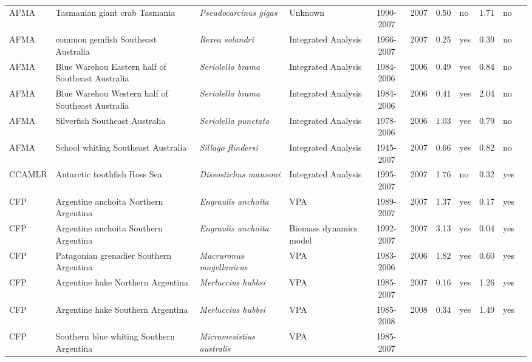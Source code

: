\begin{longtable}{p{1.8cm}p{3.5cm}p{3.5cm}p{3cm}cccp{0.9cm}cp{0.9cm}c}
  AFMA & Tasmanian giant crab Tasmania & \textit{Pseudocarcinus gigas} & Unknown & 1990-2007 & 2007 & 0.50 & no & 1.71 & no & \cite{JENSEN_TASGIANTCRAB_2008.pdf} \\ 
  AFMA & common gemfish Southeast Australia & \textit{Rexea solandri} & Integrated Analysis & 1966-2007 & 2007 & 0.25 & yes & 0.39 & no & \cite{GEMFISHSE.pdf} \\ 
  AFMA & Blue Warehou Eastern half of Southeast Australia & \textit{Seriolella brama} & Integrated Analysis & 1984-2006 & 2006 & 0.49 & yes & 0.84 & no & \cite{WAREHOUSE.pdf} \\ 
  AFMA & Blue Warehou Western half of Southeast Australia & \textit{Seriolella brama} & Integrated Analysis & 1984-2006 & 2006 & 0.41 & yes & 2.04 & no & \cite{WAREHOUSE.pdf} \\ 
  AFMA & Silverfish Southeast Australia & \textit{Seriolella punctata} & Integrated Analysis & 1978-2006 & 2006 & 1.03 & yes & 0.79 & no & \cite{SILVERFISHSE.pdf} \\ 
  AFMA & School whiting Southeast Australia & \textit{Sillago flindersi} & Integrated Analysis & 1945-2007 & 2007 & 0.66 & yes & 0.82 & no & \cite{SWHITSE.pdf} \\ 
  CCAMLR & Antarctic toothfish Ross Sea & \textit{Dissostichus mawsoni} & Integrated Analysis & 1995-2007 & 2007 & 1.76 & no & 0.32 & yes & \cite{ATOOTHFISHRS.pdf} \\ 
  CFP & Argentine anchoita Northern Argentina & \textit{Engraulis anchoita} & VPA & 1989-2007 & 2007 & 1.37 & yes & 0.17 & yes & \cite{Hansen-ANCHOVY-N-2007.pdf} \\ 
  CFP & Argentine anchoita Southern Argentina & \textit{Engraulis anchoita} & Biomass dynamics model & 1992-2007 & 2007 & 3.13 & yes & 0.04 & yes & \cite{Hansen-ANCHOVY-S-2007.pdf} \\ 
  CFP & Patagonian grenadier Southern Argentina & \textit{Macruronus magellanicus} & VPA & 1983-2006 & 2006 & 1.82 & yes & 0.60 & yes & \cite{Giussi-hoki-2007.pdf} \\ 
  CFP & Argentine hake Northern Argentina & \textit{Merluccius hubbsi} & VPA & 1985-2007 & 2007 & 0.16 & yes & 1.26 & yes & \cite{Irusta-hake-N-2007.pdf} \\ 
  CFP & Argentine hake Southern Argentina & \textit{Merluccius hubbsi} & VPA & 1985-2008 & 2008 & 0.34 & yes & 1.49 & yes & \cite{Renzi-hake-S-2009.pdf} \\ 
  CFP &  Southern blue whiting Southern Argentina & \textit{Micromesistius australis} & VPA & 1985-2007 &  &  &  &  &  & \cite{Giussi-polaca-2007.pdf} \\ 

\end{longtable}
